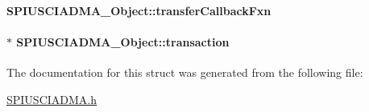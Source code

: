 \paragraph[{transfer\+Callback\+Fxn}]{ S\+P\+I\+U\+S\+C\+I\+A\+D\+M\+A\+\_\+\+Object\+::transfer\+Callback\+Fxn}\label{struct_s_p_i_u_s_c_i_a_d_m_a___object_a796145d03c0defb17215b30b51ab9605}
\paragraph[{transaction}]{$\ast$ S\+P\+I\+U\+S\+C\+I\+A\+D\+M\+A\+\_\+\+Object\+::transaction}\label{struct_s_p_i_u_s_c_i_a_d_m_a___object_ad4a7ffe0d4c63fa15828258e5b7204d0}


The documentation for this struct was generated from the following file\+:\begin{DoxyCompactItemize}
\item 
\hyperlink{_s_p_i_u_s_c_i_a_d_m_a_8h}{S\+P\+I\+U\+S\+C\+I\+A\+D\+M\+A.\+h}\end{DoxyCompactItemize}
